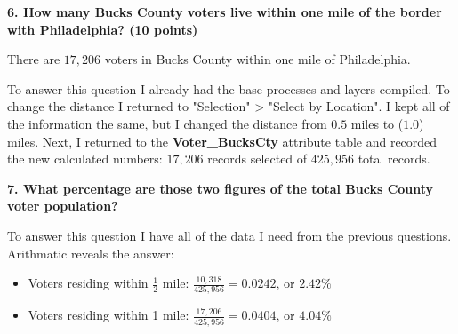 \documentclass[12pt]{article}
\begin{document}
\noindent \textbf{6.  How many Bucks County voters live within one mile of the border with Philadelphia?  (10 points)}

There are $17,206$ voters in Bucks County within one mile of Philadelphia.

To answer this question I already had the base processes and layers compiled.  To change the distance I returned to "Selection" > "Select by Location".  I kept all of the information the same, but I changed the distance from $0.5$ miles to ($1.0$) miles.  Next, I returned to the \textbf{Voter\_BucksCty} attribute table and recorded the new calculated numbers:  $17,206$ records selected of $425,956$ total records.

\noindent \textbf{7.  What percentage are those two figures of the total Bucks County voter population?}

To answer this question I have all of the data I need from the previous questions.  Arithmatic reveals the answer:  

\begin{itemize}
	\item Voters residing within $\frac{1}{2}$ mile:  $\frac{10,318}{425,956} = 0.0242$, or $2.42\%$
	\item Voters residing within 1 mile:  $\frac{17,206}{425,956} = 0.0404$, or $4.04\%$
\end{itemize}

\clearpage

\end{document}
